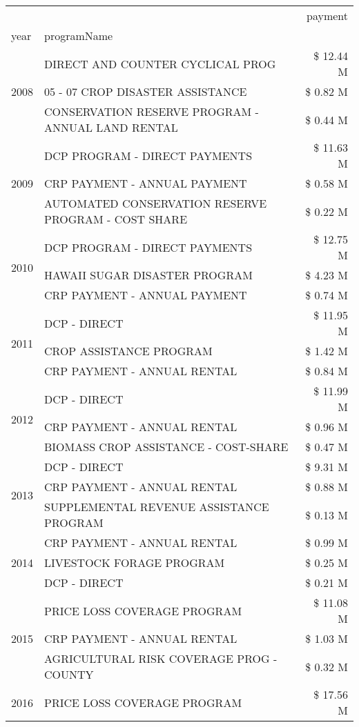 \begin{tabular}{llr}
\toprule
 &  & payment \\
year & programName &  \\
\midrule
\multirow[t]{3}{*}{2008} & DIRECT AND COUNTER CYCLICAL PROG & \$ 12.44 M \\
 & 05 - 07 CROP DISASTER ASSISTANCE & \$ 0.82 M \\
 & CONSERVATION RESERVE PROGRAM - ANNUAL LAND RENTAL & \$ 0.44 M \\
\cline{1-3}
\multirow[t]{3}{*}{2009} & DCP PROGRAM - DIRECT PAYMENTS & \$ 11.63 M \\
 & CRP PAYMENT - ANNUAL PAYMENT & \$ 0.58 M \\
 & AUTOMATED CONSERVATION RESERVE PROGRAM - COST SHARE & \$ 0.22 M \\
\cline{1-3}
\multirow[t]{3}{*}{2010} & DCP PROGRAM - DIRECT PAYMENTS & \$ 12.75 M \\
 & HAWAII SUGAR DISASTER PROGRAM & \$ 4.23 M \\
 & CRP PAYMENT - ANNUAL PAYMENT & \$ 0.74 M \\
\cline{1-3}
\multirow[t]{3}{*}{2011} & DCP - DIRECT & \$ 11.95 M \\
 & CROP ASSISTANCE PROGRAM & \$ 1.42 M \\
 & CRP PAYMENT - ANNUAL RENTAL & \$ 0.84 M \\
\cline{1-3}
\multirow[t]{3}{*}{2012} & DCP - DIRECT & \$ 11.99 M \\
 & CRP PAYMENT - ANNUAL RENTAL & \$ 0.96 M \\
 & BIOMASS CROP ASSISTANCE - COST-SHARE & \$ 0.47 M \\
\cline{1-3}
\multirow[t]{3}{*}{2013} & DCP - DIRECT & \$ 9.31 M \\
 & CRP PAYMENT - ANNUAL RENTAL & \$ 0.88 M \\
 & SUPPLEMENTAL REVENUE ASSISTANCE PROGRAM & \$ 0.13 M \\
\cline{1-3}
\multirow[t]{3}{*}{2014} & CRP PAYMENT - ANNUAL RENTAL & \$ 0.99 M \\
 & LIVESTOCK FORAGE PROGRAM & \$ 0.25 M \\
 & DCP - DIRECT & \$ 0.21 M \\
\cline{1-3}
\multirow[t]{3}{*}{2015} & PRICE LOSS COVERAGE PROGRAM & \$ 11.08 M \\
 & CRP PAYMENT - ANNUAL RENTAL & \$ 1.03 M \\
 & AGRICULTURAL RISK COVERAGE PROG - COUNTY & \$ 0.32 M \\
\cline{1-3}
\multirow[t]{3}{*}{2016} & PRICE LOSS COVERAGE PROGRAM                   & \$ 17.56 M \\

\end{tabular}
